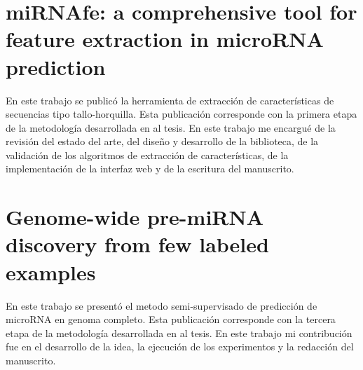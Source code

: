 \begin{appendices}
	\chapter{miRNAfe: a comprehensive tool for feature extraction in microRNA prediction}
	\label{sec:mirnafe}
	En este trabajo se publicó la herramienta de extracción de características de secuencias tipo tallo-horquilla. Esta publicación corresponde con la primera
	etapa de la metodología desarrollada en al tesis. En este trabajo me encargué de la revisión del estado del arte, del diseño y desarrollo de la biblioteca,
	de la validación de los algoritmos de extracción de características, de la implementación de la interfaz web y de la escritura del manuscrito.
	
	

	\chapter{Genome-wide pre-miRNA discovery from few labeled examples}
	\label{sec:mirnass}
	En este trabajo se presentó el metodo semi-supervisado de predicción de microRNA en genoma completo. Esta publicación corresponde con la tercera etapa de
	la metodología desarrollada en al tesis. En este trabajo mi contribución fue en el desarrollo de la idea, la ejecución de los experimentos y la redacción
	del manuscrito.
	
	
\end{appendices}

